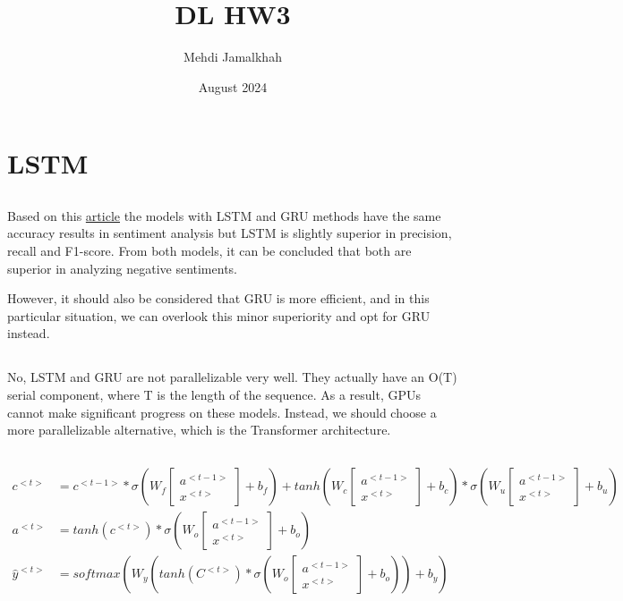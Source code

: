 \documentclass{article}
\title{DL HW3}
\author{Mehdi Jamalkhah}
\date{August 2024}
\newcommand*{\cat}[2]{
    \begin{bmatrix}
        #1 \\
        #2
        \end{bmatrix}
}
\begin{document}
\maketitle

\section{LSTM}
\subsection{}
Based on this \href{http://mathline.unwir.ac.id/index.php/Mathline/article/download/475/265}{article} the models with LSTM and GRU
methods have the same accuracy results in sentiment analysis but LSTM is slightly
superior in precision, recall and F1-score. From both models, it can be concluded that both
are superior in analyzing negative sentiments.

However, it should also be considered that GRU is more efficient, and in this particular situation, we can 
overlook this minor superiority and opt for GRU instead.

\subsection{}
No, LSTM and GRU are not parallelizable very well. They actually have an O(T) serial component, 
where T is the length of the sequence. As a result, GPUs cannot make significant progress on these models.
Instead, we should choose a more parallelizable alternative, which is the Transformer architecture.

\subsection{}
\begin{align*}
    c^{<t>} &= c^{<t-1>} * \sigma(W_f \cat{a^{<t-1>}}{x^{<t>}} + b_f) 
            + tanh(W_c \cat{a^{<t-1>}}{x^{<t>}} + b_c) * \sigma(W_u \cat{a^{<t-1>}}{x^{<t>}} + b_u) \\
    a^{<t>} &= tanh(c^{<t>}) * \sigma(W_o \cat{a^{<t-1>}}{x^{<t>}} + b_o) \\
    \hat{y}^{<t>} &= softmax (W_y (tanh(C^{<t>}) * \sigma(W_o \cat{a^{<t-1>}}{x^{<t>}} + b_o)) + b_y) \\
\end{align*}
\end{document}
